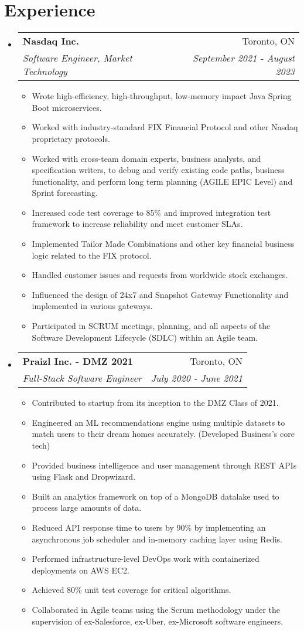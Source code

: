 \documentclass[letterpaper,11pt]{article}
\makeatletter
\newcommand{\resumeItem}[2]{
  \item\small{
    \textbf{#1}{#2 \vspace{-2pt}}
  }
}
\newcommand{\resumeSubheading}[4]{
  \vspace{-1pt}\item
    \begin{tabular*}{0.97\textwidth}[t]{l@{\extracolsep{\fill}}r}
      \textbf{#1} & #2 \\
      \textit{\small#3} & \textit{\small #4} \\
    \end{tabular*}\vspace{-5pt}
}
\newcommand{\resumeSubHeadingListStart}{\begin{itemize}[leftmargin=*]}
\newcommand{\resumeSubHeadingListEnd}{\end{itemize}}
\newcommand{\resumeItemListStart}{\begin{itemize}}
\newcommand{\resumeItemListEnd}{\end{itemize}\vspace{-5pt}}
\makeatother
\begin{document}
\section{Experience}
\resumeSubHeadingListStart
  \resumeSubheading
    {Nasdaq Inc.}{Toronto, ON}
    {Software Engineer, Market Technology}{September 2021 - August 2023}
    \resumeItemListStart
      \resumeItem{}
      {Wrote high-efficiency, high-throughput, low-memory impact Java Spring Boot microservices.}
      \resumeItem{}
      {Worked with industry-standard FIX Financial Protocol and other Nasdaq proprietary protocols.}
      \resumeItem{}
      {Worked with cross-team domain experts, business analysts, and specification writers, to debug and verify existing code paths, business functionality, and perform long term planning (AGILE EPIC Level) and Sprint forecasting.}
      \resumeItem{}
      {Increased code test coverage to 85\% and improved integration test framework to increase reliability and meet customer SLAs.}
      \resumeItem{}
      {Implemented Tailor Made Combinations and other key financial business logic related to the FIX protocol.}
      \resumeItem{}
      {Handled customer issues and requests from worldwide stock exchanges.}
      \resumeItem{}
      {Influenced the design of 24x7 and Snapshot Gateway Functionality and implemented in various gateways.}
      \resumeItem{}
      {Participated in SCRUM meetings, planning, and all aspects of the Software Development Lifecycle (SDLC) within an Agile team.}
    \resumeItemListEnd

  \resumeSubheading
  {Praizl Inc. - DMZ 2021}{Toronto, ON}
  {Full-Stack Software Engineer}{July 2020 - June 2021}
    \resumeItemListStart
      \resumeItem{}
      {Contributed to startup from its inception to the DMZ Class of 2021.}
      \resumeItem{}
      {Engineered an ML recommendations engine using multiple datasets to match users to their dream homes accurately. (Developed Business's core tech)}
      \resumeItem{}
      {Provided business intelligence and user management through REST APIs using Flask and Dropwizard.}
      \resumeItem{}
      {Built an analytics framework on top of a MongoDB datalake used to process large amounts of data.}
      \resumeItem{}
      {Reduced API response time to users by 90\% by implementing an asynchronous job scheduler and in-memory caching layer using Redis.}
      \resumeItem{}
      {Performed infrastructure-level DevOps work with containerized deployments on AWS EC2.}
      \resumeItem{}
      {Achieved 80\% unit test coverage for critical algorithms.}
      \resumeItem{}
      {Collaborated in Agile teams using the Scrum methodology under the supervision of ex-Salesforce, ex-Uber, ex-Microsoft software engineers.}
    \resumeItemListEnd
\resumeSubHeadingListEnd
\end{document}
